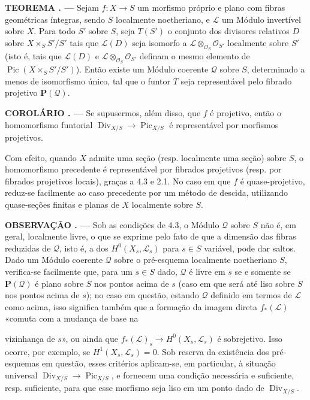 \documentclass[11pt,twoside,openany]{book}
\numberwithin{equation}{section}
\newcommand{\src}[1]{%
  \phantomsection\hypertarget{src:#1}{}%
  \marginpar{\raggedleft\footnotesize\sffamily #1}%
}
\theoremstyle{plain}
\theoremstyle{definition}
\theoremstyle{remark}
\newcommand{\result}[2]{%
  \par\medskip\noindent\textbf{#1%
  \if\relax\detokenize{#2}\relax\else\space#2\fi. ---}\enspace
}
\newcommand{\FgaUnitKey}{frontmatter}
\renewcommand{\src}[1]{%
  \phantomsection\hypertarget{src:\FgaUnitKey:#1}{}%
  \marginpar{\raggedleft\footnotesize\sffamily #1}%
}
\begin{document}
\result{TEOREMA}{4.3} Sejam $f:X\longrightarrow S$ um morfismo próprio e plano
com fibras geométricas íntegras, sendo $S$ localmente noetheriano, e
$\mathcal L$ um Módulo invertível sobre $X$. Para todo $S'$ sobre $S$, seja
$T(S')$ o conjunto dos divisores relativos $D$ sobre $X\times_SS'/S'$ tais que
$\mathcal L(D)$ seja isomorfo a
$\mathcal L\otimes_{\mathcal O_S}\mathcal O_{S'}$ localmente sobre $S'$ (isto
é, tais que $\mathcal L(D)$ e
$\mathcal L\otimes_{\mathcal O_S}\mathcal O_{S'}$ definam o mesmo elemento de
$\operatorname{Pic}(X\times_SS'/S')$). Então existe um Módulo coerente
$\mathcal Q$ sobre $S$, determinado a menos de isomorfismo único, tal que o
funtor $T$ seja representável pelo fibrado projetivo $\mathbf P(\mathcal Q)$.

\result{COROLÁRIO}{4.4} Se supusermos, além disso, que $f$ é projetivo, então o
homomorfismo funtorial
$\operatorname{Div}_{X/S}\longrightarrow\operatorname{Pic}_{X/S}$ é
representável por morfismos projetivos.

Com efeito, quando $X$ admite uma seção (resp. localmente uma seção) sobre $S$,
o homomorfismo precedente é representável por fibrados projetivos (resp. por
fibrados projetivos locais), graças a 4.3 e 2.1. No caso em que $f$ é
quase-projetivo, reduz-se facilmente ao caso precedente por um método de
descida, utilizando quase-seções finitas e planas de $X$ localmente sobre $S$.

\result{OBSERVAÇÃO}{4.5} Sob as condições de 4.3, o Módulo $\mathcal Q$ sobre
$S$ não é, em geral, localmente livre, o que se exprime pelo fato de que a
dimensão das fibras reduzidas de $\mathcal Q$, isto é, a dos
$H^0(X_s,\mathcal L_s)$ para $s\in S$ variável, pode dar saltos. Dado um Módulo
coerente $\mathcal Q$ sobre o pré-esquema localmente noetheriano $S$, verifica-se
facilmente que, para um $s\in S$ dado, $\mathcal Q$ é livre em $s$ se e somente
se $\mathbf P(\mathcal Q)$ é plano sobre $S$ nos pontos acima de $s$ (caso em
que será até liso sobre $S$ nos pontos acima de $s$); no caso em questão,
estando $\mathcal Q$ definido em termos de $\mathcal L$ como acima, isso
significa também que a formação da imagem direta $f_*(\mathcal L)$ «comuta com
a mudança de base na
\src{154}
vizinhança de $s$», ou ainda que
$f_*(\mathcal L)_s\longrightarrow H^0(X_s,\mathcal L_s)$ é sobrejetivo. Isso
ocorre, por exemplo, se $H^1(X_s,\mathcal L_s)=0$. Sob reserva da existência
dos pré-esquemas em questão, esses critérios aplicam-se, em particular, à
situação universal
$\operatorname{Div}_{X/S}\longrightarrow\operatorname{Pic}_{X/S}$, e fornecem
uma condição necessária e suficiente, resp. suficiente, para que esse morfismo
seja liso em um ponto dado de $\operatorname{Div}_{X/S}$.
\end{document}

